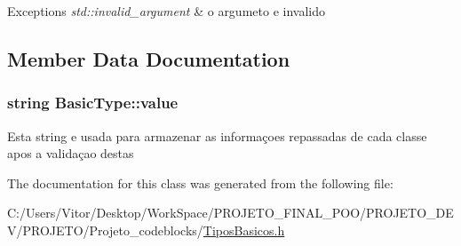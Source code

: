 \begin{DoxyExceptions}{Exceptions}
{\em std\-::invalid\-\_\-argument} & o argumeto e invalido \\
\hline
\end{DoxyExceptions}


\subsection{Member Data Documentation}
\hypertarget{class_basic_type_af9b2c5cc32647df01083a6802e913dbf}{
\subsubsection[{value}]{\setlength{\rightskip}{0pt plus 5cm}string Basic\-Type\-::value\hspace{0.3cm}{\ttfamily [protected]}}}\label{class_basic_type_af9b2c5cc32647df01083a6802e913dbf}
Esta string e usada para armazenar as informaçoes repassadas de cada classe apos a validaçao destas 

The documentation for this class was generated from the following file\-:\begin{DoxyCompactItemize}
\item 
C\-:/\-Users/\-Vitor/\-Desktop/\-Work\-Space/\-P\-R\-O\-J\-E\-T\-O\-\_\-\-F\-I\-N\-A\-L\-\_\-\-P\-O\-O/\-P\-R\-O\-J\-E\-T\-O\-\_\-\-D\-E\-V/\-P\-R\-O\-J\-E\-T\-O/\-Projeto\-\_\-codeblocks/\hyperlink{_tipos_basicos_8h}{Tipos\-Basicos.\-h}\end{DoxyCompactItemize}
